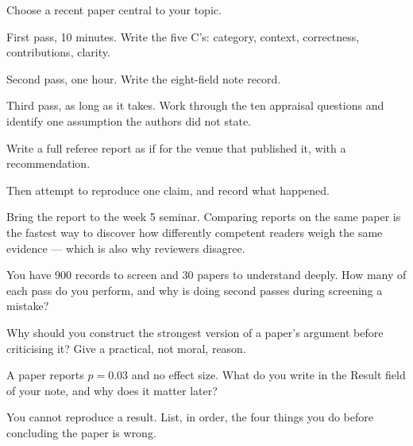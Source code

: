 \begin{lab}
Choose a recent paper central to your topic.

\begin{tightnum}
  \item First pass, 10 minutes. Write the five C's: category, context,
    correctness, contributions, clarity.
  \item Second pass, one hour. Write the eight-field note record.
  \item Third pass, as long as it takes. Work through the ten appraisal
    questions and identify one assumption the authors did not state.
  \item Write a full referee report as if for the venue that published it,
    with a recommendation.
  \item Then attempt to reproduce one claim, and record what happened.
\end{tightnum}

\medskip
Bring the report to the week 5 seminar. Comparing reports on the same paper is
the fastest way to discover how differently competent readers weigh the same
evidence --- which is also why reviewers disagree.
\end{lab}

\begin{checkpoint}
\begin{tightnum}
  \item You have 900 records to screen and 30 papers to understand deeply. How
    many of each pass do you perform, and why is doing second passes during
    screening a mistake?
  \item Why should you construct the strongest version of a paper's argument
    before criticising it? Give a practical, not moral, reason.
  \item A paper reports $p = 0.03$ and no effect size. What do you write in the
    Result field of your note, and why does it matter later?
  \item You cannot reproduce a result. List, in order, the four things you do
    before concluding the paper is wrong.
\end{tightnum}
\end{checkpoint}

